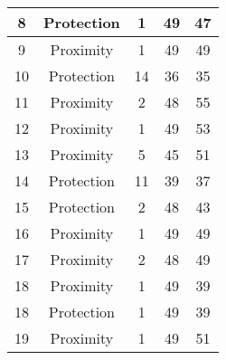 \documentclass[results.tex]{subfiles}
\begin{document}
\begin{center}
\begin{tabular}{| c || c | c | c | c |}
            \hline
            8                       & Protection                   & 1                      & 49                      & 47                   \\
            \hline
            9                       & Proximity                    & 1                      & 49                      & 49                   \\
            \hline
            10                      & Protection                   & 14                     & 36                      & 35                   \\
            \hline
            11                      & Proximity                    & 2                      & 48                      & 55                   \\
            \hline
            12                      & Proximity                    & 1                      & 49                      & 53                   \\
            \hline
            13                      & Proximity                    & 5                      & 45                      & 51                   \\
            \hline
            14                      & Protection                   & 11                     & 39                      & 37                   \\
            \hline
            15                      & Protection                   & 2                      & 48                      & 43                   \\
            \hline
            16                      & Proximity                    & 1                      & 49                      & 49                   \\
            \hline
            17                      & Proximity                    & 2                      & 48                      & 49                   \\
            \hline
            18                      & Proximity                    & 1                      & 49                      & 39                   \\
            \hline
            18                      & Protection                   & 1                      & 49                      & 39                   \\
            \hline
            19                      & Proximity                    & 1                      & 49                      & 51                   \\

\end{tabular}
\end{center}
\end{document}
